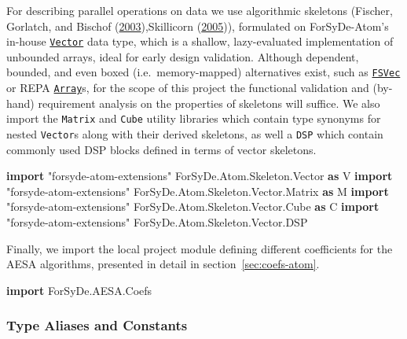 \documentclass[
  a4paper,
]{article}
\newenvironment{Shaded}{}{}
\newcommand{\DataTypeTok}[1]{\textcolor[rgb]{0.56,0.13,0.00}{#1}}
\newcommand{\KeywordTok}[1]{\textcolor[rgb]{0.00,0.44,0.13}{\textbf{#1}}}
\newcommand{\NormalTok}[1]{#1}
\begin{document}
For describing parallel operations on data we use algorithmic skeletons
(Fischer, Gorlatch, and Bischof
(\protect\hyperlink{ref-Fischer-2003}{2003}),Skillicorn
(\protect\hyperlink{ref-skillicorn05}{2005})), formulated on
ForSyDe-Atom's in-house
\href{http://hackage.haskell.org/package/forsyde-shallow/docs/ForSyDe-Shallow-Core-Vector.html}{\texttt{Vector}}
data type, which is a shallow, lazy-evaluated implementation of
unbounded arrays, ideal for early design validation. Although dependent,
bounded, and even boxed (i.e.~memory-mapped) alternatives exist, such as
\href{http://hackage.haskell.org/package/parameterized-data/docs/Data-Param-FSVec.html}{\texttt{FSVec}}
or REPA \href{http://hackage.haskell.org/package/repa}{\texttt{Array}}s,
for the scope of this project the functional validation and (by-hand)
requirement analysis on the properties of skeletons will suffice. We
also import the \texttt{Matrix} and \texttt{Cube} utility libraries
which contain type synonyms for nested \texttt{Vector}s along with their
derived skeletons, as well a \texttt{DSP} which contain commonly used
DSP blocks defined in terms of vector skeletons.

\begin{Shaded}
\begin{Highlighting}[numbers=left,,firstnumber=58,]
\KeywordTok{import}\NormalTok{ "forsyde-atom-extensions" }\DataTypeTok{ForSyDe.Atom.Skeleton.Vector}        \KeywordTok{as} \DataTypeTok{V}
\KeywordTok{import}\NormalTok{ "forsyde-atom-extensions" }\DataTypeTok{ForSyDe.Atom.Skeleton.Vector.Matrix} \KeywordTok{as} \DataTypeTok{M}
\KeywordTok{import}\NormalTok{ "forsyde-atom-extensions" }\DataTypeTok{ForSyDe.Atom.Skeleton.Vector.Cube}   \KeywordTok{as} \DataTypeTok{C}
\KeywordTok{import}\NormalTok{ "forsyde-atom-extensions" }\DataTypeTok{ForSyDe.Atom.Skeleton.Vector.DSP}
\end{Highlighting}
\end{Shaded}

Finally, we import the local project module defining different
coefficients for the AESA algorithms, presented in detail in
section~\ref{sec:coefs-atom}.

\begin{Shaded}
\begin{Highlighting}[numbers=left,,firstnumber=66,]
\KeywordTok{import} \DataTypeTok{ForSyDe.AESA.Coefs}
\end{Highlighting}
\end{Shaded}

\hypertarget{sec:cube-aliases-shallow}{%
\subsubsection{Type Aliases and
Constants}\label{sec:cube-aliases-shallow}}
\end{document}
